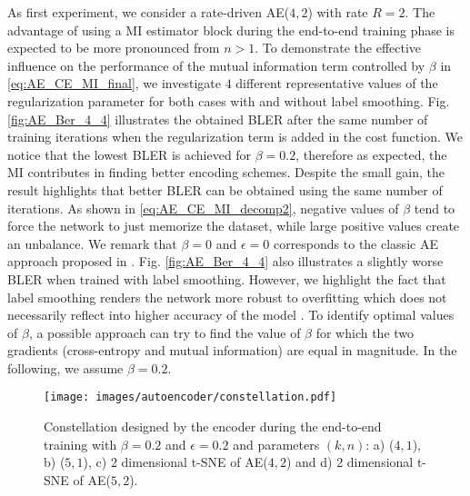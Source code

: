 As first experiment, we consider a rate-driven AE($4,2$) with rate $R=2$. The advantage of using a MI estimator block during the end-to-end training phase is expected to be more pronounced from $n>1$. To demonstrate the effective influence on the performance of the mutual information term controlled by $\beta$ in \eqref{eq:AE_CE_MI_final}, we investigate $4$ different representative values of the regularization parameter for both cases with and without label smoothing. Fig. \ref{fig:AE_Ber_4_4} illustrates the obtained BLER after the same number of training iterations when the regularization term is added in the cost function. We notice that the lowest BLER is achieved for $\beta=0.2$, therefore as expected, the MI contributes in finding better encoding schemes. Despite the small gain, the result highlights that better BLER can be obtained using the same number of iterations. As shown in \eqref{eq:AE_CE_MI_decomp2}, negative values of $\beta$ tend to force the network to just memorize the dataset, while large positive values create an unbalance. We remark that $\beta=0$ and $\epsilon=0$ corresponds to the classic AE approach proposed in \cite{Oshea2017}. Fig. \ref{fig:AE_Ber_4_4} also illustrates a slightly worse BLER when trained with label smoothing. However, we highlight the fact that label smoothing renders the network more robust to overfitting which does not necessarily reflect into higher accuracy of the model \cite{Muller2019}.
To identify optimal values of $\beta$, a possible approach can try to find the value of $\beta$ for which the two gradients (cross-entropy and mutual information) are equal in magnitude. In the following, we assume $\beta=0.2$.

\begin{figure}
	\centering
	\texttt{[image: images/autoencoder/constellation.pdf]}
	\caption{Constellation designed by the encoder during the end-to-end training with $\beta=0.2$ and $\epsilon=0.2$ and parameters $(k,n)$: a) ($4,1$), b) ($5,1$), c) 2 dimensional t-SNE of AE($4,2$) and d)  2 dimensional t-SNE of AE($5,2$).}
	\label{fig:AE_constellation}
\end{figure}

